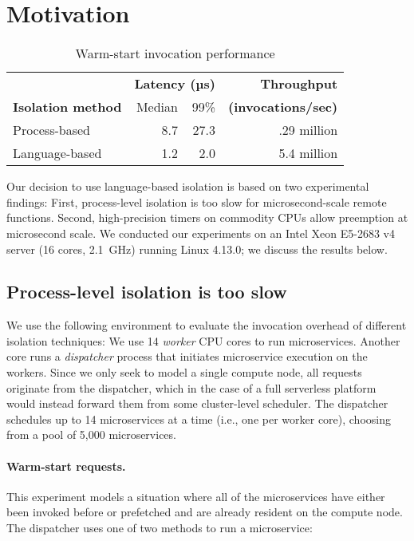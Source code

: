 \section{Motivation}
\label{sec:motive}

\begin{table}
\begin{center}
\small
\begin{tabular}{lrrr}
   & \multicolumn{2}{c}{\textbf{Latency (µs)}} & \textbf{Throughput} \\
  \textbf{Isolation method} & Median & 99\% & \textbf{(invocations/sec)} \\
\midrule
Process-based & 8.7 & 27.3 & .29 million \\
Language-based & 1.2 & 2.0 & 5.4 million \\
\end{tabular}
\caption{Warm-start invocation performance}
\label{tab:warm_start}
\end{center}
\end{table}

Our decision to use language-based isolation is based on two experimental
findings:  First, process-level isolation is too slow for
microsecond-scale remote functions. Second, high-precision timers on commodity
CPUs allow preemption at microsecond scale.  We conducted our experiments
on an Intel Xeon E5-2683 v4 server (16 cores, 2.1~GHz) running
Linux 4.13.0; we discuss the results below.

\subsection{Process-level isolation is too slow}
We use the following environment to evaluate the invocation overhead of different
isolation techniques: We use 14 \emph{worker} CPU cores to run microservices. Another
core runs a \emph{dispatcher} process that initiates microservice execution on the
workers.  Since we only seek to model a single compute node, all requests originate
from the dispatcher, which in the case of a full serverless platform would instead
forward them from some cluster-level scheduler.  The dispatcher schedules up to 14
microservices at a time (i.e., one per worker core), choosing from a pool of 5,000
microservices.

\paragraph{Warm-start requests.}
This experiment models a situation where all of the microservices have either been
invoked before or prefetched and are already resident on the compute node.  The
dispatcher uses one of two methods to run a microservice:

